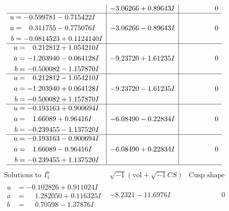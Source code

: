 \documentclass[1p]{elsarticle_modified}
\theoremstyle{definition}
\newcommand{\I}{\sqrt{-1}}
\begin{document}
$$\begin{array}{c|c|c}
 & -3.06266 + 0.89643 I & \phantom{-0.000000 } 0 \\ \hline\begin{aligned}
u &= -0.599781 - 0.715422 I \\
a &= \phantom{-}0.311755 - 0.775076 I \\
b &= -0.0814523 + 0.1124140 I\end{aligned}
 & -3.06266 - 0.89643 I & \phantom{-0.000000 } 0 \\ \hline\begin{aligned}
u &= \phantom{-}0.212812 + 1.054210 I \\
a &= -1.203940 - 0.064128 I \\
b &= -0.500082 - 1.157870 I\end{aligned}
 & -9.23720 + 1.61235 I & \phantom{-0.000000 } 0 \\ \hline\begin{aligned}
u &= \phantom{-}0.212812 - 1.054210 I \\
a &= -1.203940 + 0.064128 I \\
b &= -0.500082 + 1.157870 I\end{aligned}
 & -9.23720 - 1.61235 I & \phantom{-0.000000 } 0 \\ \hline\begin{aligned}
u &= -0.193163 + 0.900694 I \\
a &= \phantom{-}1.66089 + 0.96416 I \\
b &= -0.239455 - 1.137520 I\end{aligned}
 & -6.08490 - 0.22834 I & \phantom{-0.000000 } 0 \\ \hline\begin{aligned}
u &= -0.193163 - 0.900694 I \\
a &= \phantom{-}1.66089 - 0.96416 I \\
b &= -0.239455 + 1.137520 I\end{aligned}
 & -6.08490 + 0.22834 I & \phantom{-0.000000 } 0\\
 \hline 
 \end{array}$$\newpage$$\begin{array}{c|c|c}  
\text{Solutions to }I^u_{1}& \I (\text{vol} + \sqrt{-1}CS) & \text{Cusp shape}\\
 \hline 
\begin{aligned}
u &= -0.102826 + 0.911024 I \\
a &= \phantom{-}1.282050 + 0.116325 I \\
b &= \phantom{-}0.70598 - 1.37876 I\end{aligned}
 & -8.2321 - 11.6976 I & \phantom{-0.000000 } 0 \\ \hline\begin{aligned}

\end{aligned}
\end{array}$$
\end{document}
